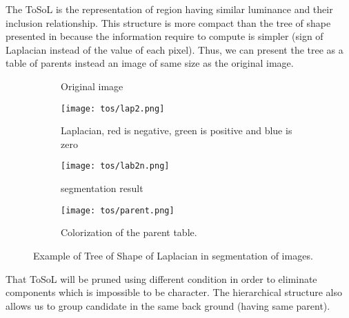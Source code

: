 \par
The ToSoL is the representation of region having similar luminance and their inclusion relationship. This structure is more compact than the tree of shape presented in \cite{geraud.13.ismm} because the information require to compute is simpler (sign of Laplacian instead of the value of each pixel). Thus, we can present the tree as a table of parents instead an image of same size as the original image. 

\begin{figure}
	\centering
	\begin{subfigure}[t]{2in}
		\centering
	 	 \caption{Original image}\label{fig:tosOri} \end{subfigure}   
	\begin{subfigure}[t]{2in}
		\centering
	 	\texttt{[image: tos/lap2.png]} \caption{Laplacian, red is negative, green is positive and blue is zero}\label{fig:tosLap} \end{subfigure}   
	\begin{subfigure}[t]{2in}
		\centering
		\texttt{[image: tos/lab2n.png]} \caption{segmentation result}\label{fig:tosLab} \end{subfigure}
	\centering
		
	\begin{subfigure}[t]{2in}
		\centering
		\texttt{[image: tos/parent.png]} 
		\caption{Colorization of the parent table.}\label{fig:tosParent} \end{subfigure}					
	\centering
	\caption[Example of \textit{Tree of Shape of Laplacian}] {Example of Tree of Shape of Laplacian in segmentation of images.  }
	\label{fig:ToS}
\end{figure}

\par That ToSoL will be pruned using different condition in order to eliminate components which is impossible to be character. The hierarchical structure also allows us to group candidate in the same back ground (having same parent). 

